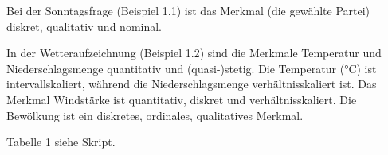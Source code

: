 \begin{exmp}
  Bei der Sonntagsfrage (Beispiel 1.1) ist das Merkmal (die gewählte
  Partei) diskret, qualitativ und nominal.
  
  In der Wetteraufzeichnung (Beispiel 1.2) sind die Merkmale Temperatur und
  Niederschlagsmenge quantitativ und (quasi-)stetig. Die Temperatur
  ($\si{\celsius}$) ist intervallskaliert, während die
  Niederschlagsmenge verhältnisskaliert ist. Das Merkmal Windstärke ist
  quantitativ, diskret und verhältnisskaliert. Die Bewölkung ist ein diskretes,
  ordinales, qualitatives Merkmal.
\end{exmp}

Tabelle 1 siehe Skript.